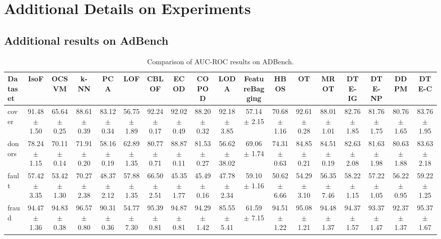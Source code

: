 \section{Additional Details on Experiments}

\subsection{Additional results on AdBench}

\begin{table}[ht]
    \centering
    \caption{Comparison of AUC-ROC results on ADBench.}
    \begin{adjustbox}{max width=\textwidth}
\begin{tabular}{lccccccccccccccccc}
\toprule
         Dataset &              IsoF &             OCSVM &              k-NN &               PCA &               LOF &             CBLOF &              ECOD &            COPOD &              LODA &    FeatureBagging &              HBOS &                OT &              MROT &            DTE-IG &            DTE-NP &              DDPM &             DTE-C \\
\midrule
           cover &  91.48 $\pm$ 1.50 &  65.64 $\pm$ 0.25 &  88.61 $\pm$ 0.39 &  83.12 $\pm$ 0.34 &  56.75 $\pm$ 1.89 &  92.24 $\pm$ 0.17 &  92.02 $\pm$ 0.49 & 88.20 $\pm$ 0.32 &  92.18 $\pm$ 3.85 &  57.14 $\pm$ 2.15 &  70.68 $\pm$ 1.16 &  92.61 $\pm$ 0.28 &  88.01 $\pm$ 1.01 &  82.76 $\pm$ 1.85 &  81.76 $\pm$ 1.75 &  80.76 $\pm$ 1.65 &  83.76 $\pm$ 1.95 \\
          donors &  78.24 $\pm$ 1.15 &  70.11 $\pm$ 0.14 &  71.91 $\pm$ 0.20 &  58.16 $\pm$ 0.19 &  62.89 $\pm$ 1.35 &  80.77 $\pm$ 0.71 &  88.87 $\pm$ 0.11 & 81.53 $\pm$ 0.27 & 56.62 $\pm$ 38.02 &  69.06 $\pm$ 1.74 &  74.31 $\pm$ 0.63 &  84.85 $\pm$ 0.21 &  84.51 $\pm$ 0.19 &  82.63 $\pm$ 2.08 &  81.63 $\pm$ 1.98 &  80.63 $\pm$ 1.88 &  83.63 $\pm$ 2.18 \\
           fault &  57.42 $\pm$ 3.35 &  53.42 $\pm$ 1.30 &  70.27 $\pm$ 2.38 &  48.37 $\pm$ 2.12 &  57.88 $\pm$ 1.35 &  66.50 $\pm$ 2.51 &  45.35 $\pm$ 1.77 & 45.49 $\pm$ 0.16 &  47.78 $\pm$ 2.34 &  59.10 $\pm$ 1.16 &  50.62 $\pm$ 6.66 &  54.29 $\pm$ 3.10 &  56.35 $\pm$ 7.46 &  58.22 $\pm$ 1.15 &  57.22 $\pm$ 1.05 &  56.22 $\pm$ 0.95 &  59.22 $\pm$ 1.25 \\
           fraud &  94.47 $\pm$ 1.36 &  94.83 $\pm$ 0.38 &  96.57 $\pm$ 0.80 &  90.31 $\pm$ 0.36 &  54.77 $\pm$ 7.30 &  95.39 $\pm$ 0.81 &  94.87 $\pm$ 0.81 & 94.29 $\pm$ 1.42 &  85.55 $\pm$ 5.41 &  61.59 $\pm$ 7.15 &  94.51 $\pm$ 1.22 &  95.08 $\pm$ 1.21 &  94.48 $\pm$ 1.37 &  94.37 $\pm$ 1.57 &  93.37 $\pm$ 1.47 &  92.37 $\pm$ 1.37 &  95.37 $\pm$ 1.67 \\

\end{tabular}
\end{adjustbox}
\end{table}
